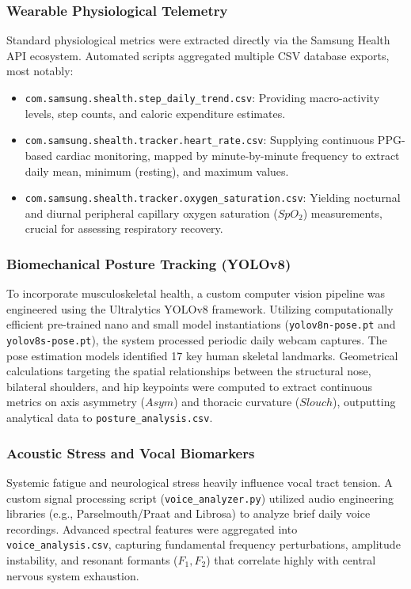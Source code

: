 \documentclass[11pt,a4paper]{article}
\begin{document}
\subsubsection{Wearable Physiological Telemetry}
Standard physiological metrics were extracted directly via the Samsung Health API ecosystem. Automated scripts aggregated multiple CSV database exports, most notably:
\begin{itemize}
    \item \texttt{com.samsung.shealth.step\_daily\_trend.csv}: Providing macro-activity levels, step counts, and caloric expenditure estimates.
    \item \texttt{com.samsung.shealth.tracker.heart\_rate.csv}: Supplying continuous PPG-based cardiac monitoring, mapped by minute-by-minute frequency to extract daily mean, minimum (resting), and maximum values.
    \item \texttt{com.samsung.shealth.tracker.oxygen\_saturation.csv}: Yielding nocturnal and diurnal peripheral capillary oxygen saturation ($SpO_2$) measurements, crucial for assessing respiratory recovery.
\end{itemize}

\subsubsection{Biomechanical Posture Tracking (YOLOv8)}
To incorporate musculoskeletal health, a custom computer vision pipeline was engineered using the Ultralytics YOLOv8 framework. Utilizing computationally efficient pre-trained nano and small model instantiations (\texttt{yolov8n-pose.pt} and \texttt{yolov8s-pose.pt}), the system processed periodic daily webcam captures. The pose estimation models identified 17 key human skeletal landmarks. Geometrical calculations targeting the spatial relationships between the structural nose, bilateral shoulders, and hip keypoints were computed to extract continuous metrics on axis asymmetry ($Asym$) and thoracic curvature ($Slouch$), outputting analytical data to \texttt{posture\_analysis.csv}.

\subsubsection{Acoustic Stress and Vocal Biomarkers}
Systemic fatigue and neurological stress heavily influence vocal tract tension. A custom signal processing script (\texttt{voice\_analyzer.py}) utilized audio engineering libraries (e.g., Parselmouth/Praat and Librosa) to analyze brief daily voice recordings. Advanced spectral features were aggregated into \texttt{voice\_analysis.csv}, capturing fundamental frequency perturbations, amplitude instability, and resonant formants ($F_1, F_2$) that correlate highly with central nervous system exhaustion.
\end{document}

